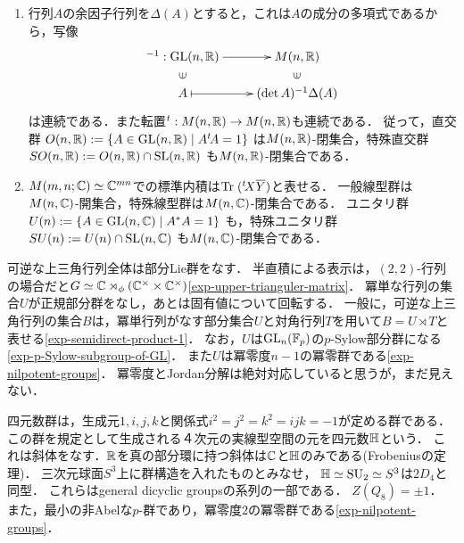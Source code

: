 \documentclass[uplatex,dvipdfmx]{jsreport}
\begin{document}
\begin{example}\mbox{}
    \begin{enumerate}
        \item 
    行列$A$の余因子行列を$\Delta(A)$とすると，これは$A$の成分の多項式であるから，写像
    \[\xymatrix@R-2pc{
        {}^{-1}:\GL(n,\R)\ar[r]&M(n,\R)\\
        \rotatebox[origin=c]{90}{$\in$}&\rotatebox[origin=c]{90}{$\in$}\\
        A\ar@{|->}[r]&(\det A)^{-1}\Delta(A)
    }\]
    は連続である．また転置${}^t:M(n,\mathbb{R})\to M(n,\mathbb{R})$も連続である．
    従って，直交群
    $O(n,\mathbb{R}):=\{A\in\mathrm{GL}(n,\mathbb{R})\mid A{}^t\!A=1\}$
    は$M(n,\mathbb{R})$-閉集合，特殊直交群
    $SO(n,\mathbb{R}):=O(n,\mathbb{R})\cap\mathrm{SL}(n,\mathbb{R})$
    も$M(n,\mathbb{R})$-閉集合である．
    \item $M(m,n;\mathbb{C})\simeq\mathbb{C}^{mn}$での標準内積は$\mathrm{Tr}\;({}^t\!X\overline{Y})$と表せる．
    一般線型群は$M(n,\mathbb{C})$-開集合，特殊線型群は$M(n,\mathbb{C})$-閉集合である．
    ユニタリ群
    $U(n):=\{A\in\mathrm{GL}(n,\mathbb{C})\mid A^*A=1\}$
    も，特殊ユニタリ群
    $SU(n):=U(n)\cap\mathrm{SL}(n,\mathbb{C})$
    も$M(n,\mathbb{C})$-閉集合である．
    \end{enumerate}
\end{example}

\begin{example}[上三角行列の空間]
    可逆な上三角行列全体は部分Lie群をなす．
    半直積による表示は，$(2,2)$-行列の場合だと$G\simeq\mathbb{C}\rtimes_\phi(\mathbb{C}^\times\times\mathbb{C}^\times)$\ref{exp-upper-trianguler-matrix}．
    冪単な行列の集合$U$が正規部分群をなし，あとは固有値について回転する．
    一般に，可逆な上三角行列の集合$B$は，冪単行列がなす部分集合$U$と対角行列$T$を用いて$B=U\rtimes T$と表せる\ref{exp-semidirect-product-1}．
    なお，$U$は$\mathrm{GL}_n(\mathbb{F}_p)$の$p$-Sylow部分群になる\ref{exp-p-Sylow-subgroup-of-GL}．
    また$U$は冪零度$n-1$の冪零群である\ref{exp-nilpotent-groups}．
    冪零度とJordan分解は絶対対応していると思うが，まだ見えない．
\end{example}

\begin{example}
    四元数群は，生成元$1,i,j,k$と関係式$i^2=j^2=k^2=ijk=-1$が定める群である．
    この群を規定として生成される４次元の実線型空間の元を四元数$\mathbb{H}$という．
    これは斜体をなす．$\mathbb{R}$を真の部分環に持つ斜体は$\mathbb{C}$と$\mathbb{H}$のみである(Frobeniusの定理)．
    三次元球面$S^3$上に群構造を入れたものとみなせ，
    $\mathbb{H}\simeq\mathrm{SU}_2\simeq S^3$は$2D_4$と同型．
    これらはgeneral dicyclic groupsの系列の一部である．
    $Z(Q_8)=\pm1$．
    また，最小の非Abelな$p$-群であり，冪零度$2$の冪零群である\ref{exp-nilpotent-groups}．
\end{example}
\end{document}
